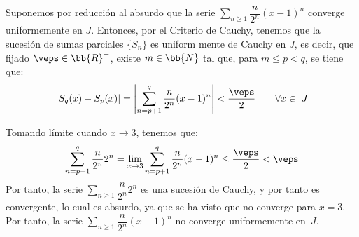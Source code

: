 \begin{ejercicio}
\begin{enumerate}
\begin{itemize}
            Suponemos por reducción al absurdo que la serie $\sum\limits_{n\geq 1}\dfrac{n}{2^n}(x-1)^n$ converge uniformemente en $J$. Entonces, por el Criterio de Cauchy, tenemos que la sucesión de sumas parciales $\{S_n\}$ es uniform
            mente de Cauchy en $J$, es decir, que fijado
            $\veps\in \bb{R}^+$, existe $m\in \bb{N}$ tal que, para $m\leq p < q$, se tiene que:
            \begin{equation*}
                |S_q(x) - S_p(x)| = \left|\sum_{n=p+1}^q \frac{n}{2^n}(x-1)^n\right| < \frac{\veps}{2} \qquad \forall x\in~J
            \end{equation*}

            Tomando límite cuando $x\to 3$, tenemos que:
            \begin{equation*}
                \sum_{n=p+1}^q \frac{n}{2^n}2^n = \lim_{x\to 3}\sum_{n=p+1}^q \frac{n}{2^n}(x-1)^n \leq \frac{\veps}{2} < \veps
            \end{equation*}
            Por tanto, la serie $\sum\limits_{n\geq 1}\dfrac{n}{2^n}2^n$ es una sucesión de Cauchy, y por tanto es convergente, lo cual es absurdo, ya que se ha visto que no converge para $x=3$. Por tanto, la serie $\sum\limits_{n\geq 1}\dfrac{n}{2^n}(x-1)^n$ no converge uniformemente en~$J$.
        \end{itemize}
    \end{enumerate}
\end{ejercicio}